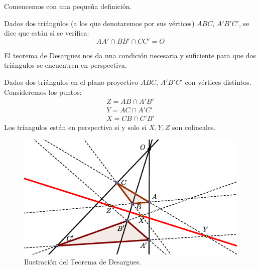 Comencemos con una pequeña definición.
\begin{defi}
	Dados dos triángulos (a los que denotaremos por sus vértices) $ABC$, $A'B'C'$, se dice que están  si se verifica:
	\[AA'\cap BB'\cap CC'=O\]
\end{defi}
El teorema de Desargues nos da una condición necesaria y suficiente para que dos triángulos se encuentren en perspectiva.
\begin{theo}
	\label{C7_teo_desargues1}
	Dados dos triángulos en el plano proyectivo $ABC$, $A'B'C'$ con vértices distintos. Consideremos los puntos:
	\[\begin{array}{c}
	Z=AB\cap A'B'\\
	Y=AC\cap A'C'\\
	X=CB\cap C'B'
	\end{array}\]
	Los tríangulos están en perspectiva si y solo si $X,Y,Z$ son colineales.
	\begin{figure}[h]
		\centering
		\includegraphics[scale=.45]{Graficos/desargues.eps}
		\caption{Ilustración del Teorema de Desargues.}
		\label{C7_img_desargues}
	\end{figure}
	
\end{theo}
